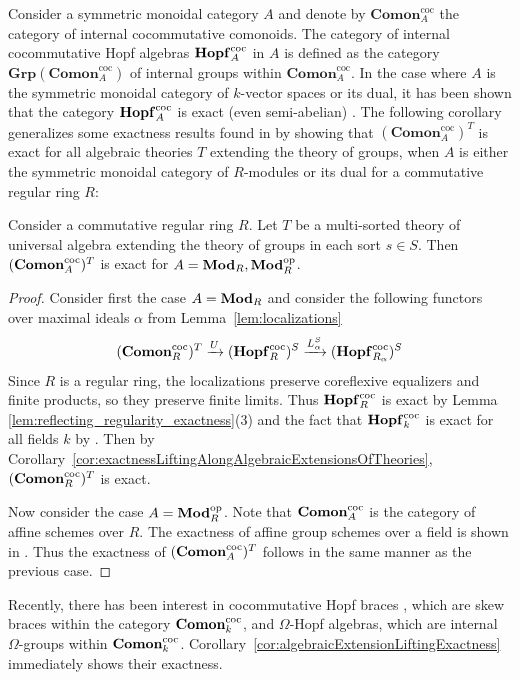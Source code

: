 Consider a symmetric monoidal category $A$ and denote by $\mathbf{Comon}^{\mathrm{coc}}_A$ the category of internal cocommutative comonoids. The category of internal cocommutative Hopf algebras $\mathbf{Hopf}_A^{\mathrm{coc}}$ in $A$ is defined as the category $\mathbf{Grp}(\mathbf{Comon}^{\mathrm{coc}}_A)$ of internal groups within $\mathbf{Comon}^{\mathrm{coc}}_A$. In the case where $A$ is the symmetric monoidal category of $k$-vector spaces or its dual, it has been shown that the category $\mathbf{Hopf}^{\mathrm{coc}}_A$ is exact (even semi-abelian) \cite{GRAN20194171, forsman2026semiabeliannessaffinegroupschemes}. The following corollary generalizes some exactness results found in \cite{bevilacquaCoalgebraicModelsOmega2026, granHopfBracesSemiabelian2026} by showing that $(\mathbf{Comon}^{\mathrm{coc}}_A)^T$ is exact for all algebraic theories $T$ extending the theory of groups, when $A$ is either the symmetric monoidal category of $R$-modules or its dual for a commutative regular ring $R$:
\begin{corollary}\label{cor:algebraicExtensionLiftingExactness}
    Consider a commutative regular ring $R$. Let $T$ be a multi-sorted theory of universal algebra extending the theory of groups in each sort $s\in S$. Then $(\mathbf{Comon}_A^{\mathrm{coc}})^T$ is exact for $A = \mathbf{Mod}_R, \mathbf{Mod}_R^\mathrm{op}$.
\end{corollary}
\begin{proof}
    Consider first the case $A = \mathbf{Mod}_R$ and consider the following functors over maximal ideals $\alpha$ from Lemma~\ref{lem:localizations}
    $$
    (\mathbf{Comon}_R^{\mathrm{coc}})^T\xrightarrow{U} (\mathbf{Hopf}_R^{\mathrm{coc}})^S\xrightarrow{L_\alpha^S} (\mathbf{Hopf}_{R_\alpha}^{\mathrm{coc}})^S
    $$
    Since $R$ is a regular ring, the localizations preserve coreflexive equalizers and finite products, so they preserve finite limits. Thus $\mathbf{Hopf}_R^{\mathrm{coc}}$ is exact by Lemma \ref{lem:reflecting_regularity_exactness}(3) and the fact that $\mathbf{Hopf}_k^{\mathrm{coc}}$ is exact for all fields $k$ by \cite{GRAN20194171}. Then by Corollary~\ref{cor:exactnessLiftingAlongAlgebraicExtensionsOfTheories}, $(\mathbf{Comon}_R^{\mathrm{coc}})^T$ is exact. 

    Now consider the case $A = \mathbf{Mod}_R^{\mathrm{op}}$. Note that $\mathbf{Comon}_A^{\mathrm{coc}}$ is the category of affine schemes over $R$. The exactness of affine group schemes over a field is shown in \cite{forsman2026semiabeliannessaffinegroupschemes}. Thus the exactness of $(\mathbf{Comon}_A^{\mathrm{coc}})^T$ follows in the same manner as the previous case.
\end{proof}

Recently, there has been interest in cocommutative Hopf braces \cite{agoreCategoryHopfBraces2026, Angiono_2016}, which are skew braces within the category $\mathbf{Comon}_k^{\mathrm{coc}}$, and $\Omega$-Hopf algebras, which are internal $\Omega$-groups \cite{bevilacquaCoalgebraicModelsOmega2026} within $\mathbf{Comon}_k^{\mathrm{coc}}$. Corollary~\ref{cor:algebraicExtensionLiftingExactness} immediately shows their exactness. 